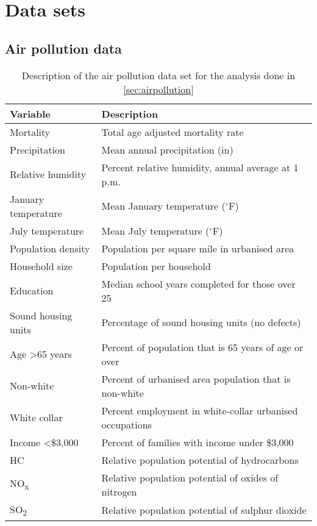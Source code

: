 \section{Data sets}


\subsection{Air pollution data}
\label{apx:airpollution}

\begin{table}[H]
\centering
\caption{Description of the air pollution data set for the analysis done in \cref{sec:airpollution}}
\label{tab:airpollution}
\begin{tabular}{ll}
\toprule
Variable                 & Description \\
\midrule
Mortality                & Total age adjusted mortality rate \\
Precipitation            & Mean annual precipitation (in) \\
Relative humidity        & Percent relative humidity, annual average at 1 p.m. \\
January temperature      & Mean January temperature ($^\circ$F) \\
July temperature         & Mean July temperature ($^\circ$F) \\
Population density       & Population per square mile in urbanised area \\
Household size & Population per household  \\
Education                & Median school years completed for those over 25 \\
Sound housing units      & Percentage of sound housing units (no defects) \\
Age >65 years            & Percent of population that is 65 years of age or over \\
Non-white                & Percent of urbanised area population that is non-white \\
White collar             & Percent employment in white-collar urbanised occupations \\
Income <\$3,000          & Percent of families with income under \$3,000 \\      
HC                       & Relative population potential of hydrocarbons \\     
NO\textsubscript{x}      & Relative population potential of oxides of nitrogen \\
SO\textsubscript{2}      & Relative population potential of sulphur dioxide \\       
\end{tabular}
\end{table}

